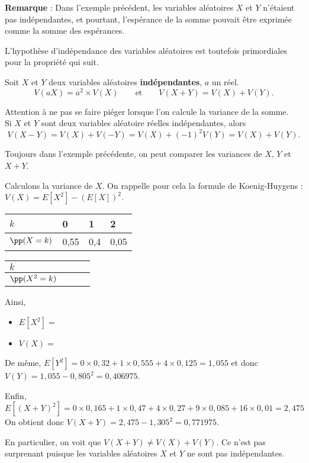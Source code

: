 \documentclass[11pt,fleqn, openany]{book} %
\begin{document}
\textbf{Remarque} : Dans l'exemple précédent, les variables aléatoires $X$ et $Y$ n'étaient pas indépendantes, et pourtant, l'espérance de la somme pouvait être exprimée comme la somme des espérances.

L'hypothèse d'indépendance des variables aléatoires est toutefois primordiales pour la propriété qui suit.

\begin{proposition}Soit $X$ et $Y$ deux variables aléatoires \textbf{indépendantes}, $a$ un réel.
\[V(aX)=a^2\times V(X) \qquad\text{et}\qquad  V(X+Y)=V(X)+V(Y).\]\vspace{-0,5cm}
\end{proposition}

Attention à ne pas se faire piéger lorsque l'on calcule la variance de la somme. \\
Si $X$ et $Y$ sont deux variables aléatoire réelles indépendantes, alors \[V(X-Y)=V(X)+V(-Y)=V(X)+(-1)^2V(Y)=V(X)+V(Y).\]

\begin{example}Toujours dans l'exemple précédente, on peut comparer les variances de $X$, $Y$ et $X+Y$. 

Calculons la variance de $X$. On rappelle pour cela la formule de Koenig-Huygens : $V(X)=E[X^2]-(E[X])^2$.

\renewcommand{\arraystretch}{1.5}
\begin{minipage}{0.45\linewidth}
\begin{tabularx}{\linewidth}{|l|X|X|X|}
\hline
$k$ & 0 & 1 & 2  \\
\hline
$\pp(X=k)$ & 0,55 & 0,4 & 0,05  \\
\hline
\end{tabularx}
\end{minipage}\hfill\begin{minipage}{0.45\linewidth}
\begin{tabularx}{\linewidth}{|l|X|X|X|}
\hline
$k$ &  &  &   \\
\hline
$\pp(X^2=k)$ &  &  &  \\
\hline
\end{tabularx}
\end{minipage}

Ainsi,
\begin{itemize}
\item $E[X^2]=$
\item $V(X)=$
\end{itemize}

De même, $E[Y^2]=0 \times 0,32 + 1 \times 0,555 + 4 \times 0,125 = 1,055$ et donc $V(Y)=1,055-0,805^2 = 0,406975$.

Enfin, $E[(X+Y)^2]=0\times 0,165 + 1 \times 0,47 + 4 \times 0,27 + 9 \times 0,085 + 16 \times 0,01 = 2,475$\\
On obtient donc $V(X+Y)=2,475-1,305^2=0,771975$.

En particulier, on voit que $V(X+Y)\neq V(X) + V(Y)$. Ce n'est pas surprenant puisque les variables aléatoires $X$ et $Y$ ne sont pas indépendantes.

\end{example}
\vspace{-0,5cm}
\end{document}
